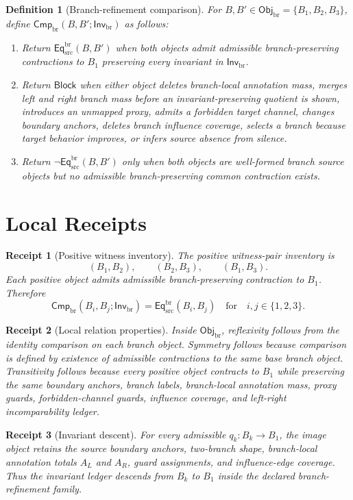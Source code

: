 \documentclass[11pt]{article}
\newcommand{\EqBr}{\mathsf{Eq}_{\mathrm{src}}^{\mathrm{br}}}
\newcommand{\ObjBr}{\mathsf{Obj}_{\mathrm{br}}}
\newcommand{\InvBr}{\mathsf{Inv}_{\mathrm{br}}}
\newcommand{\CmpBr}{\mathsf{Cmp}_{\mathrm{br}}}
\newcommand{\Block}{\mathsf{Block}}
\newtheorem{definitionblock}{Definition}
\newtheorem{receipt}{Receipt}
\begin{document}
\begin{definitionblock}[Branch-refinement comparison]
For \(B,B'\in\ObjBr=\{B_{1},B_{2},B_{3}\}\), define
\(\CmpBr(B,B';\InvBr)\) as follows:
\begin{enumerate}
    \item Return \(\EqBr(B,B')\) when both objects admit admissible
    branch-preserving contractions to \(B_{1}\) preserving every invariant
    in \(\InvBr\).
    \item Return \(\Block\) when either object deletes branch-local
    annotation mass, merges left and right branch mass before an
    invariant-preserving quotient is shown, introduces an unmapped proxy,
    admits a forbidden target channel, changes boundary anchors, deletes
    branch influence coverage, selects a branch because target behavior
    improves, or infers source absence from silence.
    \item Return \(\neg\EqBr(B,B')\) only when both objects are
    well-formed branch source objects but no admissible branch-preserving
    common contraction exists.
\end{enumerate}
\end{definitionblock}

\section{Local Receipts}

\begin{receipt}[Positive witness inventory]
The positive witness-pair inventory is
\[
    (B_{1},B_{2}),\qquad (B_{2},B_{3}),\qquad (B_{1},B_{3}).
\]
Each positive object admits admissible branch-preserving contraction to
\(B_{1}\). Therefore
\[
    \CmpBr(B_i,B_j;\InvBr)=\EqBr(B_i,B_j)
    \quad\text{for}\quad i,j\in\{1,2,3\}.
\]
\end{receipt}

\begin{receipt}[Local relation properties]
Inside \(\ObjBr\), reflexivity follows from the identity comparison on
each branch object. Symmetry follows because comparison is defined by
existence of admissible contractions to the same base branch object.
Transitivity follows because every positive object contracts to \(B_{1}\)
while preserving the same boundary anchors, branch labels, branch-local
annotation mass, proxy guards, forbidden-channel guards, influence
coverage, and left-right incomparability ledger.
\end{receipt}

\begin{receipt}[Invariant descent]
For every admissible \(q_{k}:B_{k}\to B_{1}\), the image object retains
the source boundary anchors, two-branch shape, branch-local annotation
totals \(A_{L}\) and \(A_{R}\), guard assignments, and influence-edge
coverage. Thus the invariant ledger descends from \(B_{k}\) to \(B_{1}\)
inside the declared branch-refinement family.
\end{receipt}
\end{document}
